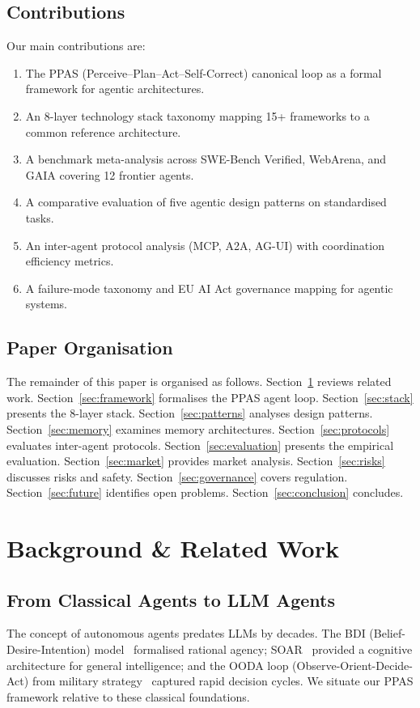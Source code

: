 \documentclass[12pt, a4paper]{article}
\begin{document}
\subsection{Contributions}
Our main contributions are:
\begin{enumerate}
    \item The \textsc{PPAS} (Perceive--Plan--Act--Self-Correct) canonical loop as a formal framework for agentic architectures.
    \item An 8-layer technology stack taxonomy mapping 15+ frameworks to a common reference architecture.
    \item A benchmark meta-analysis across SWE-Bench Verified, WebArena, and GAIA covering 12 frontier agents.
    \item A comparative evaluation of five agentic design patterns on standardised tasks.
    \item An inter-agent protocol analysis (MCP, A2A, AG-UI) with coordination efficiency metrics.
    \item A failure-mode taxonomy and EU AI Act governance mapping for agentic systems.
\end{enumerate}

\subsection{Paper Organisation}
The remainder of this paper is organised as follows. Section~\ref{sec:background} reviews related work. Section~\ref{sec:framework} formalises the PPAS agent loop. Section~\ref{sec:stack} presents the 8-layer stack. Section~\ref{sec:patterns} analyses design patterns. Section~\ref{sec:memory} examines memory architectures. Section~\ref{sec:protocols} evaluates inter-agent protocols. Section~\ref{sec:evaluation} presents the empirical evaluation. Section~\ref{sec:market} provides market analysis. Section~\ref{sec:risks} discusses risks and safety. Section~\ref{sec:governance} covers regulation. Section~\ref{sec:future} identifies open problems. Section~\ref{sec:conclusion} concludes.

\section{Background \& Related Work}\label{sec:background}

\subsection{From Classical Agents to LLM Agents}
The concept of autonomous agents predates LLMs by decades. The BDI (Belief-Desire-Intention) model~\citep{rao1995bdi} formalised rational agency; SOAR~\citep{laird2012soar} provided a cognitive architecture for general intelligence; and the OODA loop (Observe-Orient-Decide-Act) from military strategy~\citep{boyd1987ooda} captured rapid decision cycles. We situate our PPAS framework relative to these classical foundations.
\end{document}
